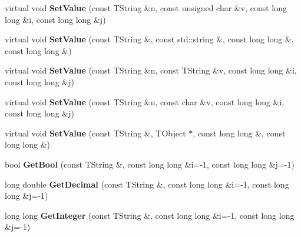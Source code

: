 \begin{DoxyCompactItemize}
\item 
\hypertarget{class_h_a_l_1_1_analysis_data_a976258cc088753ba46ddad2b89bec07a}{virtual void {\bfseries Set\-Value} (const T\-String \&n, const unsigned char \&v, const long long \&i, const long long \&j)}\label{class_h_a_l_1_1_analysis_data_a976258cc088753ba46ddad2b89bec07a}

\item 
\hypertarget{class_h_a_l_1_1_analysis_data_a3782d0d87d85a96370d1c1b26523bc7e}{virtual void {\bfseries Set\-Value} (const T\-String \&, const std\-::string \&, const long long \&, const long long \&)}\label{class_h_a_l_1_1_analysis_data_a3782d0d87d85a96370d1c1b26523bc7e}

\item 
\hypertarget{class_h_a_l_1_1_analysis_data_a6cc252333af3e3c425ad4a184f286816}{virtual void {\bfseries Set\-Value} (const T\-String \&n, const T\-String \&v, const long long \&i, const long long \&j)}\label{class_h_a_l_1_1_analysis_data_a6cc252333af3e3c425ad4a184f286816}

\item 
\hypertarget{class_h_a_l_1_1_analysis_data_a7ce85e90fa181f17d72476422da24a48}{virtual void {\bfseries Set\-Value} (const T\-String \&n, const char \&v, const long long \&i, const long long \&j)}\label{class_h_a_l_1_1_analysis_data_a7ce85e90fa181f17d72476422da24a48}

\item 
\hypertarget{class_h_a_l_1_1_analysis_data_aedeeb6d1ff74a47232f5cb33edfbd88c}{virtual void {\bfseries Set\-Value} (const T\-String \&, T\-Object $\ast$, const long long \&, const long long \&)}\label{class_h_a_l_1_1_analysis_data_aedeeb6d1ff74a47232f5cb33edfbd88c}

\item 
\hypertarget{class_h_a_l_1_1_analysis_data_a281cfe7bf707071ac81004f415842f50}{bool {\bfseries Get\-Bool} (const T\-String \&, const long long \&i=-\/1, const long long \&j=-\/1)}\label{class_h_a_l_1_1_analysis_data_a281cfe7bf707071ac81004f415842f50}

\item 
\hypertarget{class_h_a_l_1_1_analysis_data_aab51c395613c253b5bdd019eb72a78dc}{long double {\bfseries Get\-Decimal} (const T\-String \&, const long long \&i=-\/1, const long long \&j=-\/1)}\label{class_h_a_l_1_1_analysis_data_aab51c395613c253b5bdd019eb72a78dc}

\item 
\hypertarget{class_h_a_l_1_1_analysis_data_a4695a073f8dc031fd3f0c0c2d6d4a64e}{long long {\bfseries Get\-Integer} (const T\-String \&, const long long \&i=-\/1, const long long \&j=-\/1)}\label{class_h_a_l_1_1_analysis_data_a4695a073f8dc031fd3f0c0c2d6d4a64e}


\end{DoxyCompactItemize}
